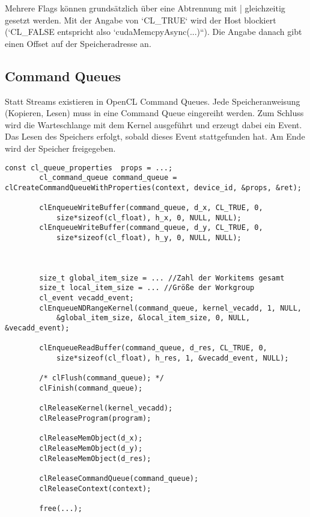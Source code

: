 			Mehrere Flags können grundsätzlich über eine Abtrennung mit | gleichzeitig gesetzt werden. Mit der Angabe von \li`CL_TRUE` wird der Host blockiert (\li`CL_FALSE entspricht also \li`cudaMemcpyAsync(...)``). Die Angabe danach gibt einen Offset auf der Speicheradresse an.
							
			\subsection{Command Queues}
			Statt \Glspl{Stream} existieren in OpenCL \Glspl{Command Queue}. Jede Speicheranweisung (Kopieren, Lesen) muss in eine \Gls{Command Queue} eingereiht werden. Zum Schluss wird die Warteschlange mit dem \Gls{Kernel} ausgeführt und erzeugt dabei ein Event. Das Lesen des Speichers erfolgt, sobald dieses Event stattgefunden hat. Am Ende wird der Speicher freigegeben.
			
		\begin{lstlisting}[caption=~Command Queues und Clean-Up]
		const cl_queue_properties  props = ...; 
		cl_command_queue command_queue = clCreateCommandQueueWithProperties(context, device_id, &props, &ret);
		
		clEnqueueWriteBuffer(command_queue, d_x, CL_TRUE, 0, 
			size*sizeof(cl_float), h_x, 0, NULL, NULL);	
		clEnqueueWriteBuffer(command_queue, d_y, CL_TRUE, 0, 
			size*sizeof(cl_float), h_y, 0, NULL, NULL);
				
				
				
		size_t global_item_size = ... //Zahl der Workitems gesamt
		size_t local_item_size = ... //Größe der Workgroup
		cl_event vecadd_event;
		clEnqueueNDRangeKernel(command_queue, kernel_vecadd, 1, NULL, 
			&global_item_size, &local_item_size, 0, NULL, &vecadd_event);
		
		clEnqueueReadBuffer(command_queue, d_res, CL_TRUE, 0, 
			size*sizeof(cl_float), h_res, 1, &vecadd_event, NULL);  
			
		/* clFlush(command_queue); */
		clFinish(command_queue);
		
		clReleaseKernel(kernel_vecadd);
		clReleaseProgram(program);
  
		clReleaseMemObject(d_x);
		clReleaseMemObject(d_y);
		clReleaseMemObject(d_res);

		clReleaseCommandQueue(command_queue);
		clReleaseContext(context);

		free(...);
		\end{lstlisting}
		
